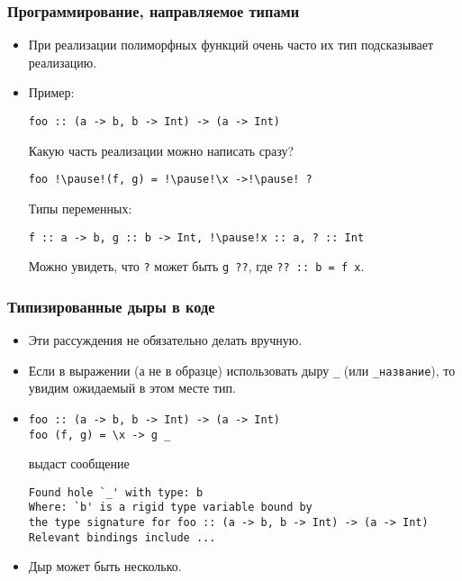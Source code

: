 \documentclass[10pt]{beamer}
\begin{document}
\begin{frame}[fragile]
\frametitle{Программирование, направляемое типами}
\begin{itemize}
    \item При реализации полиморфных функций очень часто их тип подсказывает реализацию. 
    \item Пример:
\begin{lstlisting}
foo :: (a -> b, b -> Int) -> (a -> Int)
\end{lstlisting}
Какую часть реализации можно написать сразу?
\begin{lstlisting}
foo !\pause!(f, g) = !\pause!\x ->!\pause! ?
\end{lstlisting}
Типы переменных:\pause
\begin{lstlisting}
f :: a -> b, g :: b -> Int, !\pause!x :: a, ? :: Int
\end{lstlisting}
Можно увидеть, что \lstinline|?| может быть \lstinline|g ??|, где \lstinline|?? :: |\pause\lstinline|b = |\pause\lstinline|f x|.
\end{itemize}
\end{frame}

\begin{frame}[fragile]
\frametitle{Типизированные дыры в коде}
\begin{itemize}
    \item Эти рассуждения не обязательно делать вручную.
    \item Если в выражении (а не в образце) использовать дыру \lstinline|_| (или \lstinline|_название|), то увидим ожидаемый в этом месте тип.
    \item
\begin{lstlisting}
foo :: (a -> b, b -> Int) -> (a -> Int)
foo (f, g) = \x -> g _
\end{lstlisting}
    выдаст сообщение
\begin{lstlisting}
Found hole `_' with type: b
Where: `b' is a rigid type variable bound by
the type signature for foo :: (a -> b, b -> Int) -> (a -> Int)
Relevant bindings include ...
\end{lstlisting}
    \item Дыр может быть несколько.
\end{itemize}
\end{frame}
\end{document}
